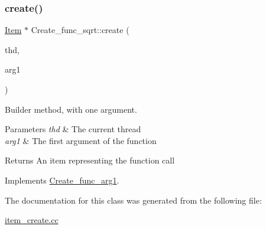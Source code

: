 \subsubsection{\texorpdfstring{create()}{create()}}
{\footnotesize\ttfamily \mbox{\hyperlink{classItem}{Item}} $\ast$ Create\+\_\+func\+\_\+sqrt\+::create (\begin{DoxyParamCaption}\item[{T\+HD $\ast$}]{thd,  }\item[{\mbox{\hyperlink{classItem}{Item}} $\ast$}]{arg1 }\end{DoxyParamCaption})\hspace{0.3cm}{\ttfamily [virtual]}}

Builder method, with one argument. 
\begin{DoxyParams}{Parameters}
{\em thd} & The current thread \\
\hline
{\em arg1} & The first argument of the function \\
\hline
\end{DoxyParams}
\begin{DoxyReturn}{Returns}
An item representing the function call 
\end{DoxyReturn}


Implements \mbox{\hyperlink{classCreate__func__arg1_a3e9a98f755cd82c3e762e334c955a8c9}{Create\+\_\+func\+\_\+arg1}}.



The documentation for this class was generated from the following file\+:\begin{DoxyCompactItemize}
\item 
\mbox{\hyperlink{item__create_8cc}{item\+\_\+create.\+cc}}\end{DoxyCompactItemize}
